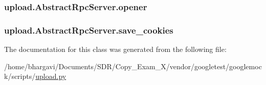 \subsubsection[{\texorpdfstring{opener}{opener}}]{\setlength{\rightskip}{0pt plus 5cm}upload.\+Abstract\+Rpc\+Server.\+opener}\hypertarget{classupload_1_1_abstract_rpc_server_aa931446476e0e86f3ade7fef0a0aea5a}{}\label{classupload_1_1_abstract_rpc_server_aa931446476e0e86f3ade7fef0a0aea5a}
\subsubsection[{\texorpdfstring{save\+\_\+cookies}{save_cookies}}]{\setlength{\rightskip}{0pt plus 5cm}upload.\+Abstract\+Rpc\+Server.\+save\+\_\+cookies}\hypertarget{classupload_1_1_abstract_rpc_server_affe342205c4647d41b127f5a5634858b}{}\label{classupload_1_1_abstract_rpc_server_affe342205c4647d41b127f5a5634858b}


The documentation for this class was generated from the following file\+:\begin{DoxyCompactItemize}
\item 
/home/bhargavi/\+Documents/\+S\+D\+R/\+Copy\+\_\+\+Exam\+\_\+X/vendor/googletest/googlemock/scripts/\hyperlink{googlemock_2scripts_2upload_8py}{upload.\+py}\end{DoxyCompactItemize}
